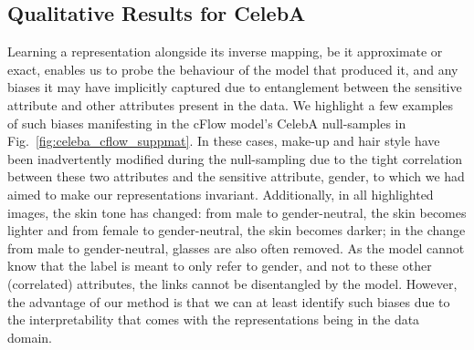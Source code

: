 \subsection{Qualitative Results for CelebA}\label{sec:qual-results-celeba}
%
\noindent Learning a representation alongside its inverse mapping, be it approximate or exact,
enables us to probe the behaviour of the model that produced it, and any biases it may have
implicitly captured due to entanglement between the sensitive attribute and other attributes
present in the data. 
%
We highlight a few examples of such biases manifesting in the \ac{cFlow} model's CelebA null-samples in
Fig.~\ref{fig:celeba_cflow_suppmat}. 
%
In these cases, make-up and hair style have been inadvertently modified during the null-sampling
due to the tight correlation between these two attributes and the sensitive attribute, gender, to
which we had aimed to make our representations invariant. 
%
Additionally, in all highlighted images, the skin tone has changed: from male to gender-neutral,
the skin becomes lighter and from female to gender-neutral, the skin becomes darker; in the change
from male to gender-neutral, glasses are also often removed.
%
As the model cannot know that the label is meant to only refer to gender, and not to these other
(correlated) attributes, the links cannot be disentangled by the model.
%
However, the advantage of our method is that we can at least identify such biases due to the
interpretability that comes with the representations being in the data domain.

